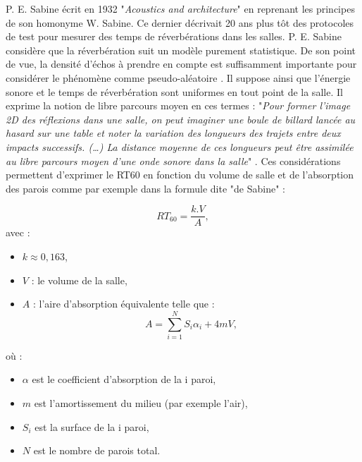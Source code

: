 P. E. Sabine écrit en 1932 "\textit{Acoustics and architecture}" en reprenant les principes de son homonyme W. Sabine. Ce dernier décrivait 20 ans plus tôt des protocoles de test pour mesurer des temps de réverbérations dans les salles. P. E. Sabine considère que la réverbération suit un modèle purement statistique. De son point de vue, la densité d'échos à prendre en compte est suffisamment importante pour considérer le phénomène comme pseudo-aléatoire \cite[p. 19]{Kandelman}. Il suppose ainsi que l’énergie sonore et le temps de réverbération sont uniformes en tout point de la salle. Il exprime la notion de libre parcours moyen en ces termes : "\textit{Pour former l’image 2D des réflexions dans une salle, on peut imaginer une boule de billard lancée au hasard sur une table et noter la variation des longueurs des trajets entre deux impacts successifs. (…) La distance moyenne de ces longueurs peut être assimilée au libre parcours moyen d’une onde sonore dans la salle}" \cite[]{sabine2}. Ces considérations permettent d'exprimer le \gls{RT60} en fonction du volume de salle et de l'absorption des parois comme par exemple dans la formule dite "de Sabine" \cite[p. 71-81]{jouhaneau}: 

\begin{equation}
   	RT_{60} = \frac{k.V}{A},
\end{equation}
avec :
\begin{itemize}
\item $k \approx 0,163$,
\item $V$ : le volume de la salle,
\item $A$ : l'aire d'absorption équivalente telle que : 
\begin{equation}
   	A = \sum_{i=1}^N S_{i}\alpha_{i} + 4mV,
\end{equation}
\end{itemize}
où :
\begin{itemize}
\item $\alpha$ est le coefficient d'absorption de la i paroi,
\item $m$ est l'amortissement du milieu (par exemple l'air),
\item $S_{i}$ est la surface de la i paroi,
\item $N$ est le nombre de parois total.
\end{itemize}

